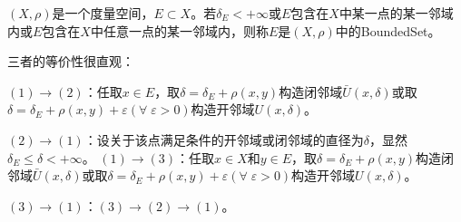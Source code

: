 \begin{definition}
	$(X,\rho)$是一个度量空间，$E\subset X$。若$\delta_E<+\infty$或$E$包含在$X$中某一点的某一邻域内或$E$包含在$X$中任意一点的某一邻域内，则称$E$是$(X,\rho)$中的\gls{BoundedSet}。
\end{definition}
\begin{note}
	三者的等价性很直观：\par
	$(1)\to(2)$：任取$x\in E$，取$\delta=\delta_E+\rho(x,y)$构造闭邻域$\bar{U}(x,\delta)$或取$\delta=\delta_E+\rho(x,y)+\varepsilon(\forall\;\varepsilon>0)$构造开邻域$U(x,\delta)$。\par
	$(2)\to(1)$：设关于该点满足条件的开邻域或闭邻域的直径为$\delta$，显然$\delta_E\leqslant\delta<+\infty$。
	$(1)\to(3)$：任取$x\in X$和$y\in E$，取$\delta=\delta_E+\rho(x,y)$构造闭邻域$\bar{U}(x,\delta)$或取$\delta=\delta_E+\rho(x,y)+\varepsilon(\forall\;\varepsilon>0)$构造开邻域$U(x,\delta)$。\par
	$(3)\to(1)$：$(3)\to(2)\to(1)$。
\end{note}


